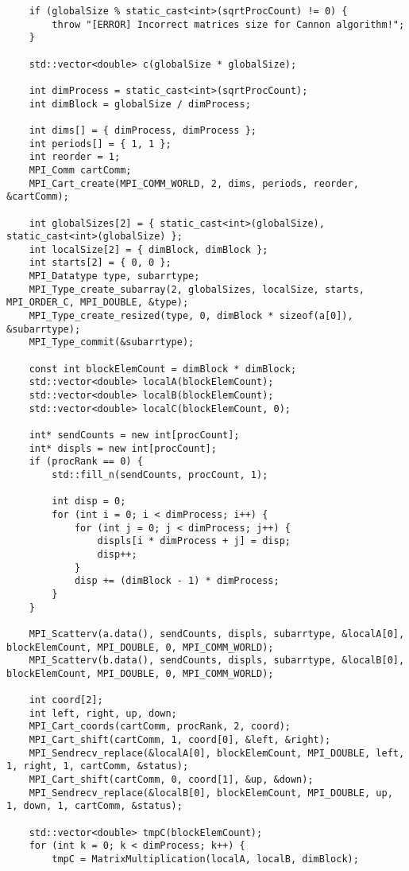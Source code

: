 \documentclass{report}
\begin{document}
\begin{lstlisting}
    if (globalSize % static_cast<int>(sqrtProcCount) != 0) {
        throw "[ERROR] Incorrect matrices size for Cannon algorithm!";
    }

    std::vector<double> c(globalSize * globalSize);

    int dimProcess = static_cast<int>(sqrtProcCount);
    int dimBlock = globalSize / dimProcess;

    int dims[] = { dimProcess, dimProcess };
    int periods[] = { 1, 1 };
    int reorder = 1;
    MPI_Comm cartComm;
    MPI_Cart_create(MPI_COMM_WORLD, 2, dims, periods, reorder, &cartComm);

    int globalSizes[2] = { static_cast<int>(globalSize), static_cast<int>(globalSize) };
    int localSize[2] = { dimBlock, dimBlock };
    int starts[2] = { 0, 0 };
    MPI_Datatype type, subarrtype;
    MPI_Type_create_subarray(2, globalSizes, localSize, starts, MPI_ORDER_C, MPI_DOUBLE, &type);
    MPI_Type_create_resized(type, 0, dimBlock * sizeof(a[0]), &subarrtype);
    MPI_Type_commit(&subarrtype);

    const int blockElemCount = dimBlock * dimBlock;
    std::vector<double> localA(blockElemCount);
    std::vector<double> localB(blockElemCount);
    std::vector<double> localC(blockElemCount, 0);

    int* sendCounts = new int[procCount];
    int* displs = new int[procCount];
    if (procRank == 0) {
        std::fill_n(sendCounts, procCount, 1);

        int disp = 0;
        for (int i = 0; i < dimProcess; i++) {
            for (int j = 0; j < dimProcess; j++) {
                displs[i * dimProcess + j] = disp;
                disp++;
            }
            disp += (dimBlock - 1) * dimProcess;
        }
    }

    MPI_Scatterv(a.data(), sendCounts, displs, subarrtype, &localA[0], blockElemCount, MPI_DOUBLE, 0, MPI_COMM_WORLD);
    MPI_Scatterv(b.data(), sendCounts, displs, subarrtype, &localB[0], blockElemCount, MPI_DOUBLE, 0, MPI_COMM_WORLD);

    int coord[2];
    int left, right, up, down;
    MPI_Cart_coords(cartComm, procRank, 2, coord);
    MPI_Cart_shift(cartComm, 1, coord[0], &left, &right);
    MPI_Sendrecv_replace(&localA[0], blockElemCount, MPI_DOUBLE, left, 1, right, 1, cartComm, &status);
    MPI_Cart_shift(cartComm, 0, coord[1], &up, &down);
    MPI_Sendrecv_replace(&localB[0], blockElemCount, MPI_DOUBLE, up, 1, down, 1, cartComm, &status);

    std::vector<double> tmpC(blockElemCount);
    for (int k = 0; k < dimProcess; k++) {
        tmpC = MatrixMultiplication(localA, localB, dimBlock);


\end{lstlisting}
\end{document}
